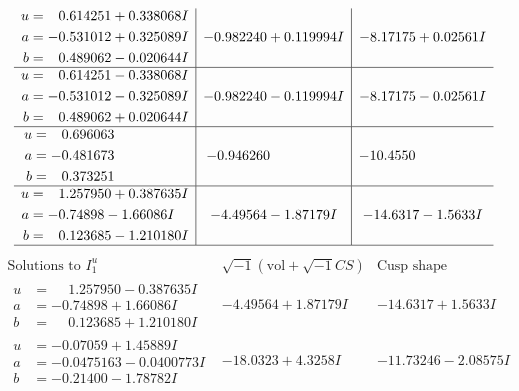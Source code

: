 \documentclass[1p]{elsarticle_modified}
\theoremstyle{definition}
\newcommand{\I}{\sqrt{-1}}
\begin{document}
$$\begin{array}{c|c|c}
\begin{aligned}
u &= \phantom{-}0.614251 + 0.338068 I \\
a &= -0.531012 + 0.325089 I \\
b &= \phantom{-}0.489062 - 0.020644 I\end{aligned}
 & -0.982240 + 0.119994 I & -8.17175 + 0.02561 I \\ \hline\begin{aligned}
u &= \phantom{-}0.614251 - 0.338068 I \\
a &= -0.531012 - 0.325089 I \\
b &= \phantom{-}0.489062 + 0.020644 I\end{aligned}
 & -0.982240 - 0.119994 I & -8.17175 - 0.02561 I \\ \hline\begin{aligned}
u &= \phantom{-}0.696063\phantom{ +0.000000I} \\
a &= -0.481673\phantom{ +0.000000I} \\
b &= \phantom{-}0.373251\phantom{ +0.000000I}\end{aligned}
 & -0.946260\phantom{ +0.000000I} & -10.4550\phantom{ +0.000000I} \\ \hline\begin{aligned}
u &= \phantom{-}1.257950 + 0.387635 I \\
a &= -0.74898 - 1.66086 I \\
b &= \phantom{-}0.123685 - 1.210180 I\end{aligned}
 & -4.49564 - 1.87179 I & -14.6317 - 1.5633 I\\
 \hline 
 \end{array}$$\newpage$$\begin{array}{c|c|c}  
\text{Solutions to }I^u_{1}& \I (\text{vol} + \sqrt{-1}CS) & \text{Cusp shape}\\
 \hline 
\begin{aligned}
u &= \phantom{-}1.257950 - 0.387635 I \\
a &= -0.74898 + 1.66086 I \\
b &= \phantom{-}0.123685 + 1.210180 I\end{aligned}
 & -4.49564 + 1.87179 I & -14.6317 + 1.5633 I \\ \hline\begin{aligned}
u &= -0.07059 + 1.45889 I \\
a &= -0.0475163 - 0.0400773 I \\
b &= -0.21400 - 1.78782 I\end{aligned}
 & -18.0323 + 4.3258 I & -11.73246 - 2.08575 I \\ \hline\begin{aligned}

\end{aligned}
\end{array}$$
\end{document}
